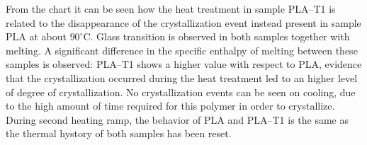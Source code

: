 \documentclass[a4paper, 11pt]{article}
\begin{document}
From the chart it can be seen how the heat treatment in sample PLA–T1 is related to the disappearance of the crystallization event instead present in sample PLA at about $90^\circ$C. Glass transition is observed in both samples together with melting. A significant difference in the specific enthalpy of melting between these samples is observed: PLA–T1 shows a higher value with respect to PLA, evidence that the crystallization occurred during the heat treatment led to an higher level of degree of crystallization. No crystallization events can be seen on cooling, due to the high amount of time required for this polymer in order to crystallize. During second heating ramp, the behavior of PLA and PLA–T1 is the same as the thermal hystory of both samples has been reset.

\newpage
\end{document}
